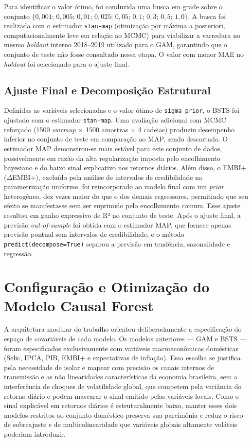 \documentclass[	12pt, Times, openright, oneside, a4paper, english, brazil]{abntex2}
\begin{document}
Para identificar o valor ótimo, foi conduzida uma busca em grade sobre o conjunto $\{0{,}001;\, 0{,}005;\, 0{,}01;\, 0{,}025;\, 0{,}05;\, 0{,}1;\, 0{,}3;\, 0{,}5;\, 1{,}0\}$. A busca foi realizada com o estimador \texttt{stan-map} (otimização por máxima a posteriori, computacionalmente leve em relação ao MCMC) para viabilizar a varredura no mesmo \textit{holdout} interno 2018--2019 utilizado para o GAM, garantindo que o conjunto de teste não fosse consultado nessa etapa. O valor com menor MAE no \textit{holdout} foi selecionado para o ajuste final.

\subsection{Ajuste Final e Decomposição Estrutural}

Definidas as variáveis selecionadas e o valor ótimo de \texttt{sigma\_prior}, o BSTS foi ajustado com o estimador \texttt{stan-map}. Uma avaliação adicional com MCMC reforçado (1500 \textit{warmup} $\times$ 1500 amostras $\times$ 4 cadeias) produziu desempenho inferior no conjunto de teste em comparação ao MAP, sendo descartada. O estimador MAP demonstrou-se mais estável para este conjunto de dados, possivelmente em razão da alta regularização imposta pelo encolhimento bayesiano e do baixo sinal explicativo nos retornos diários. Além disso, o EMBI+ ($\Delta$EMBI+), excluído pela análise de intervalos de credibilidade na parametrização uniforme, foi reincorporado ao modelo final com um \textit{prior} heterogêneo, dez vezes maior do que o dos demais regressores, permitindo que seu efeito se manifestasse sem ser suprimido pelo encolhimento comum. Esse ajuste resultou em ganho expressivo de R² no conjunto de teste. Após o ajuste final, a previsão \textit{out-of-sample} foi obtida com o estimador MAP, que fornece apenas previsão pontual sem intervalos de credibilidade, e o método \texttt{predict(decompose=True)} separou a previsão em tendência, sazonalidade e regressão.

\section{Configuração e Otimização do Modelo Causal Forest}\label{sec:cf_otimizacao}

A arquitetura modular do trabalho orientou deliberadamente a especificação do espaço de covariáveis de cada modelo. Os modelos anteriores — GAM e BSTS — foram especificados exclusivamente com variáveis macroeconômicas domésticas (Selic, IPCA, PIB, EMBI+ e expectativas de inflação). Essa escolha se justifica pela necessidade de isolar e mapear com precisão os canais internos de transmissão e as não linearidades características da economia brasileira, sem a interferência de choques de volatilidade global, que competem pela variância do retorno diário e podem mascarar o sinal emitido pelas variáveis locais. Como o sinal explicável em retornos diários é estruturalmente baixo, manter esses dois modelos restritos ao conjunto doméstico preserva sua parcimônia e reduz o risco de sobreajuste e de multicolinearidade que variáveis globais altamente voláteis poderiam introduzir.
\end{document}
